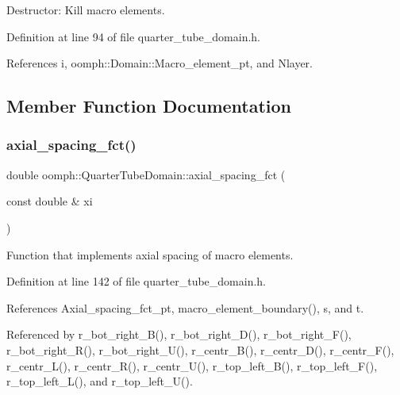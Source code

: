 Destructor\+: Kill macro elements. 



Definition at line 94 of file quarter\+\_\+tube\+\_\+domain.\+h.



References i, oomph\+::\+Domain\+::\+Macro\+\_\+element\+\_\+pt, and Nlayer.



\subsection{Member Function Documentation}
\mbox{\label{classoomph_1_1QuarterTubeDomain_a3574feea9f42e4ec95b6edec36da245a}} 
\subsubsection{\texorpdfstring{axial\+\_\+spacing\+\_\+fct()}{axial\_spacing\_fct()}}
{\footnotesize\ttfamily double oomph\+::\+Quarter\+Tube\+Domain\+::axial\+\_\+spacing\+\_\+fct (\begin{DoxyParamCaption}\item[{const double \&}]{xi }\end{DoxyParamCaption})\hspace{0.3cm}{\ttfamily [inline]}}



Function that implements axial spacing of macro elements. 



Definition at line 142 of file quarter\+\_\+tube\+\_\+domain.\+h.



References Axial\+\_\+spacing\+\_\+fct\+\_\+pt, macro\+\_\+element\+\_\+boundary(), s, and t.



Referenced by r\+\_\+bot\+\_\+right\+\_\+\+B(), r\+\_\+bot\+\_\+right\+\_\+\+D(), r\+\_\+bot\+\_\+right\+\_\+\+F(), r\+\_\+bot\+\_\+right\+\_\+\+R(), r\+\_\+bot\+\_\+right\+\_\+\+U(), r\+\_\+centr\+\_\+\+B(), r\+\_\+centr\+\_\+\+D(), r\+\_\+centr\+\_\+\+F(), r\+\_\+centr\+\_\+\+L(), r\+\_\+centr\+\_\+\+R(), r\+\_\+centr\+\_\+\+U(), r\+\_\+top\+\_\+left\+\_\+\+B(), r\+\_\+top\+\_\+left\+\_\+\+F(), r\+\_\+top\+\_\+left\+\_\+\+L(), and r\+\_\+top\+\_\+left\+\_\+\+U().

